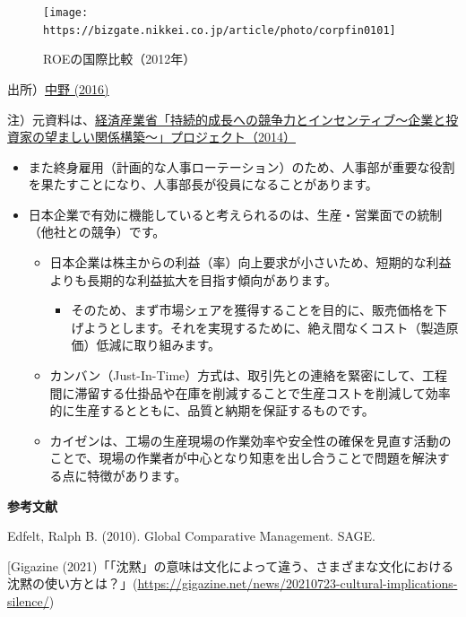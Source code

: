 \documentclass[
]{book}
\providecommand{\tightlist}{%
  \setlength{\itemsep}{0pt}\setlength{\parskip}{0pt}}
\begin{document}
\begin{figure}
\texttt{[image: https://bizgate.nikkei.co.jp/article/photo/corpfin0101]} \caption{ROEの国際比較（2012年）}\label{fig:profit}
\end{figure}

出所）\href{https://bizgate.nikkei.co.jp/article/DGXMZO3110481029052018000000}{中野 (2016)}

注）元資料は、\href{https://www.meti.go.jp/policy/economy/keiei_innovation/kigyoukaikei/pdf/itoreport.pdf}{経済産業省「持続的成長への競争力とインセンティブ～企業と投資家の望ましい関係構築～」プロジェクト（2014）}

\begin{itemize}
\item
  また終身雇用（計画的な人事ローテーション）のため、人事部が重要な役割を果たすことになり、人事部長が役員になることがあります。
\item
  日本企業で有効に機能していると考えられるのは、生産・営業面での統制（他社との競争）です。

  \begin{itemize}
  \item
    日本企業は株主からの利益（率）向上要求が小さいため、短期的な利益よりも長期的な利益拡大を目指す傾向があります。

    \begin{itemize}
    \tightlist
    \item
      そのため、まず市場シェアを獲得することを目的に、販売価格を下げようとします。それを実現するために、絶え間なくコスト（製造原価）低減に取り組みます。
    \end{itemize}
  \item
    カンバン（Just-In-Time）方式は、取引先との連絡を緊密にして、工程間に滞留する仕掛品や在庫を削減することで生産コストを削減して効率的に生産するとともに、品質と納期を保証するものです。
  \item
    カイゼンは、工場の生産現場の作業効率や安全性の確保を見直す活動のことで、現場の作業者が中心となり知恵を出し合うことで問題を解決する点に特徴があります。
  \end{itemize}
\end{itemize}

{\textbf{参考文献}}

Edfelt, Ralph B. (2010). Global Comparative Management. SAGE.

{[}Gigazine (2021)「「沈黙」の意味は文化によって違う、さまざまな文化における沈黙の使い方とは？」(\url{https://gigazine.net/news/20210723-cultural-implications-silence/})
\end{document}
